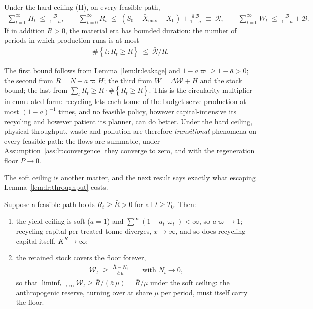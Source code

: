 \begin{lemma}\label{lem:lr:throughput}
Under the hard ceiling (H), on every feasible path,
\begin{align}
\sum_{t=0}^\infty H_t \;\le\; \frac{\mathcal B}{1-\bar a},
\qquad
\sum_{t=0}^\infty R_t \;\le\; \left(S_0+\bar X_{\max}-X_0\right)+\frac{\bar a\,\mathcal B}{1-\bar a}
\;\equiv\;\bar{\mathcal R},
\qquad
\sum_{t=0}^\infty W_t \;\le\; \frac{\mathcal B}{1-\bar a}+\mathcal B .
\label{eq:sp:lr:throughput}
\end{align}
If in addition $\bar R>0$, the material era has bounded duration: the number of periods in which production runs is at most
\begin{align}
\#\left\{t:R_t\ge\bar R\right\} \;\le\; \bar{\mathcal R}/\bar R .
\label{eq:sp:lr:duration}
\end{align}
\end{lemma}

The first bound follows from Lemma~\ref{lem:lr:leakage} and $1-a\varpi\ge1-\bar a>0$; the second from $R=N+a\varpi H$; the third from $W=\Delta\mathcal W+H$ and the stock bound; the last from $\sum_t R_t\ge\bar R\cdot\#\left\{R_t\ge\bar R\right\}$. This is the circularity multiplier in cumulated form: recycling lets each tonne of the budget serve production at most $\left(1-\bar a\right)^{-1}$ times, and no feasible policy, however capital-intensive its recycling and however patient its planner, can do better. Under the hard ceiling, physical throughput, waste and pollution are therefore \emph{transitional} phenomena on every feasible path: the flows are summable, under Assumption~\ref{ass:lr:convergence} they converge to zero, and with the regeneration floor $P\to0$.

The soft ceiling is another matter, and the next result says exactly what escaping Lemma~\ref{lem:lr:throughput} costs.

\begin{proposition}\label{prop:lr:growth}
Suppose a feasible path holds $R_t\ge\bar R>0$ for all $t\ge T_0$. Then:
\begin{enumerate}
\item the yield ceiling is soft ($\bar a=1$) and $\sum^\infty\left(1-a_t\varpi_t\right)<\infty$, so $a\varpi\to1$; recycling capital per treated tonne diverges, $x\to\infty$, and so does recycling capital itself, $K^R\to\infty$;
\item the retained stock covers the floor forever,
\begin{align}
\mathcal W_t \;\ge\; \frac{\bar R-N_t}{\bar a\,\mu}
\qquad\text{with }N_t\to0,
\label{eq:sp:lr:survival}
\end{align}
so that $\liminf_{t\to\infty}\mathcal W_t\ge\bar R/\left(\bar a\,\mu\right)=\bar R/\mu$ under the soft ceiling: the anthropogenic reserve, turning over at share $\mu$ per period, must itself carry the floor.
\end{enumerate}
\end{proposition}

